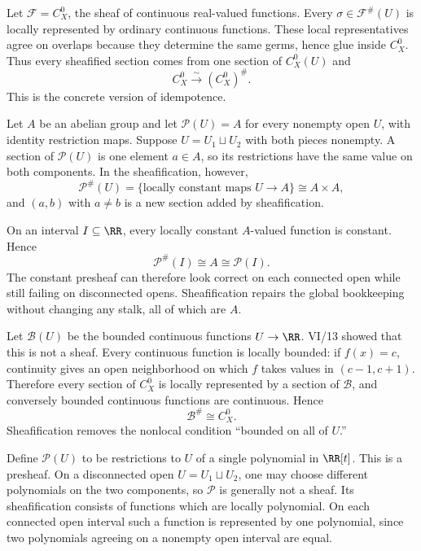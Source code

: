 \begin{example}
Let $\mathcal F=C^0_X$, the sheaf of continuous real-valued functions.  Every
$\sigma\in\mathcal F^\#(U)$ is locally represented by ordinary continuous functions.  These
local representatives agree on overlaps because they determine the same germs, hence glue
inside $C^0_X$.  Thus every sheafified section comes from one section of $C^0_X(U)$ and
\[
C^0_X\xrightarrow{\sim}(C^0_X)^\#.
\]
This is the concrete version of idempotence.
\end{example}

\begin{example}
Let $A$ be an abelian group and let $\mathcal P(U)=A$ for every nonempty open $U$, with
identity restriction maps.  Suppose $U=U_1\sqcup U_2$ with both pieces nonempty.  A section
of $\mathcal P(U)$ is one element $a\in A$, so its restrictions have the same value on both
components.  In the sheafification, however,
\[
\mathcal P^\#(U)=\{\text{locally constant maps }U\to A\}\cong A\times A,
\]
and $(a,b)$ with $a\neq b$ is a new section added by sheafification.
\end{example}

\begin{example}
On an interval $I\subseteq\RR$, every locally constant $A$-valued function is constant.
Hence
\[
\mathcal P^\#(I)\cong A\cong\mathcal P(I).
\]
The constant presheaf can therefore look correct on each connected open while still failing
on disconnected opens.  Sheafification repairs the global bookkeeping without changing any
stalk, all of which are $A$.
\end{example}

\begin{example}
Let $\mathcal B(U)$ be the bounded continuous functions $U\to\RR$.  VI/13 showed that this
is not a sheaf.  Every continuous function is locally bounded: if $f(x)=c$, continuity gives
an open neighborhood on which $f$ takes values in $(c-1,c+1)$.  Therefore every section of
$C^0_X$ is locally represented by a section of $\mathcal B$, and conversely bounded
continuous functions are continuous.  Hence
\[
\mathcal B^\#\cong C^0_X.
\]
Sheafification removes the nonlocal condition ``bounded on all of $U$.''
\end{example}

\begin{example}
Define $\mathcal P(U)$ to be restrictions to $U$ of a single polynomial in $\RR[t]$.  This
is a presheaf.  On a disconnected open $U=U_1\sqcup U_2$, one may choose different
polynomials on the two components, so $\mathcal P$ is generally not a sheaf.  Its
sheafification consists of functions which are locally polynomial.  On each connected open
interval such a function is represented by one polynomial, since two polynomials agreeing
on a nonempty open interval are equal.
\end{example}

